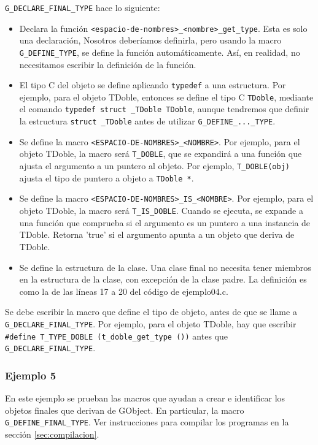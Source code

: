 \texttt{G\_DECLARE\_FINAL\_TYPE} hace lo siguiente:
\begin{itemize}
  \tightlist
\item Declara la función \texttt{<espacio-de-nombres>\_<nombre>\_get\_type}. Esta es solo una declaración,
  Nosotros deberíamos definirla, pero usando la macro \texttt{G\_DEFINE\_TYPE}, se define la función
  automáticamente. Así, en realidad, no necesitamos escribir la definición de la función.
\item El tipo C del objeto se define aplicando \texttt{typedef} a una estructura. Por ejemplo, para el objeto
  \textsf{TDoble}, entonces se define el tipo C \texttt{TDoble}, mediante el comando
  \texttt{typedef struct \_TDoble TDoble}, aunque tendremos que definir la estructura \texttt{struct \_TDoble}
  antes de utilizar \texttt{G\_DEFINE\_...\_TYPE}.
\item Se define la macro \texttt{<ESPACIO-DE-NOMBRES>\_<NOMBRE>}. Por ejemplo, para el objeto
  \textsf{TDoble}, la macro será \texttt{T\_DOBLE}, que se expandirá a una función que ajusta el argumento
  a un puntero al objeto. Por ejemplo, \texttt{T\_DOBLE(obj)} ajusta el tipo de puntero a objeto a
  \texttt{TDoble *}.
\item Se define la macro \texttt{<ESPACIO-DE-NOMBRES>\_IS\_<NOMBRE>}. Por ejemplo, para el objeto
  \textsf{TDoble}, la macro será \texttt{T\_IS\_DOBLE}. Cuando se ejecuta, se expande a una función que
  comprueba si el argumento es un puntero a una instancia de \textsf{TDoble}. Retorna 'true' si el argumento
  apunta a un objeto que deriva de \textsf{TDoble}.
\item Se define la estructura de la clase. Una clase final no necesita tener miembros en la estructura de la clase,
  con excepción de la clase padre. La definición es como la de las líneas 17 a 20 del código de  ejemplo04.c.
\end{itemize}

Se debe escribir la macro que define el tipo de objeto, antes de que se llame a
\texttt{G\_DECLARE\_FINAL\_TYPE}. Por ejemplo, para el objeto \textsf{TDoble}, hay que escribir
\texttt{\#define T\_TYPE\_DOBLE (t\_doble\_get\_type ())} antes que \texttt{G\_DECLARE\_FINAL\_TYPE}.

\subsubsection{Ejemplo 5}
En este ejemplo se prueban las macros que ayudan a crear e identificar los objetos finales que derivan
de \textsf{GObject}. En particular, la macro \texttt{G\_DEFINE\_FINAL\_TYPE}.
Ver instrucciones para compilar los programas en la sección \ref{sec:compilacion}.

